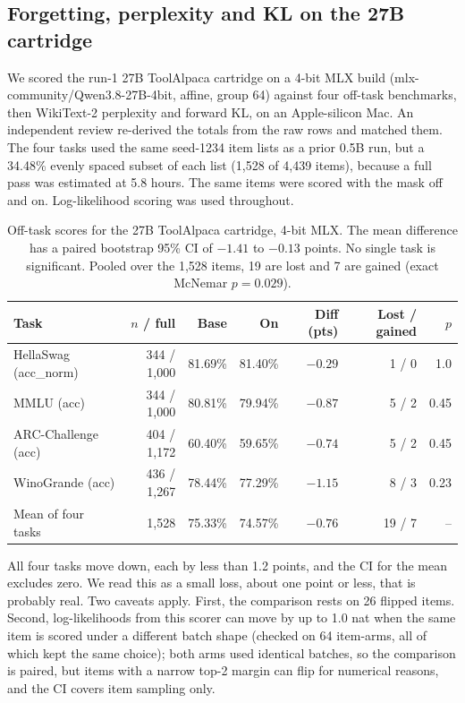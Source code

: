 \documentclass[11pt]{article}
\begin{document}
\subsection{Forgetting, perplexity and KL on the 27B cartridge}
\label{sec:forget}

We scored the run-1 27B ToolAlpaca cartridge on a 4-bit MLX build (mlx-community/Qwen3.8-27B-4bit, affine, group 64) against four off-task benchmarks, then WikiText-2 perplexity and forward KL, on an Apple-silicon Mac. An independent review re-derived the totals from the raw rows and matched them. The four tasks used the same seed-1234 item lists as a prior 0.5B run, but a 34.48\% evenly spaced subset of each list (1,528 of 4,439 items), because a full pass was estimated at 5.8 hours. The same items were scored with the mask off and on. Log-likelihood scoring was used throughout.

\begin{table}[h]
\centering
\small
\begin{tabular}{lrrrrrr}
\toprule
Task & $n$ / full & Base & On & Diff (pts) & Lost / gained & $p$ \\
\midrule
HellaSwag (acc\_norm) & 344 / 1,000 & 81.69\% & 81.40\% & $-0.29$ & 1 / 0 & 1.0 \\
MMLU (acc) & 344 / 1,000 & 80.81\% & 79.94\% & $-0.87$ & 5 / 2 & 0.45 \\
ARC-Challenge (acc) & 404 / 1,172 & 60.40\% & 59.65\% & $-0.74$ & 5 / 2 & 0.45 \\
WinoGrande (acc) & 436 / 1,267 & 78.44\% & 77.29\% & $-1.15$ & 8 / 3 & 0.23 \\
Mean of four tasks & 1,528 & 75.33\% & 74.57\% & $-0.76$ & 19 / 7 & -- \\
\bottomrule
\end{tabular}
\caption{Off-task scores for the 27B ToolAlpaca cartridge, 4-bit MLX. The mean difference has a paired bootstrap 95\% CI of $-1.41$ to $-0.13$ points. No single task is significant. Pooled over the 1,528 items, 19 are lost and 7 are gained (exact McNemar $p = 0.029$).}
\label{tab:forget}
\end{table}

All four tasks move down, each by less than 1.2 points, and the CI for the mean excludes zero. We read this as a small loss, about one point or less, that is probably real. Two caveats apply. First, the comparison rests on 26 flipped items. Second, log-likelihoods from this scorer can move by up to 1.0 nat when the same item is scored under a different batch shape (checked on 64 item-arms, all of which kept the same choice); both arms used identical batches, so the comparison is paired, but items with a narrow top-2 margin can flip for numerical reasons, and the CI covers item sampling only.
\end{document}
